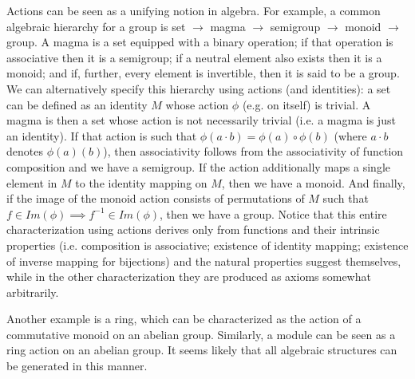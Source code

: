\documentclass[pra,twocolumn,groupedaddress,10pt]{revtex4}
\theoremstyle{definition}
\begin{document}
Actions can be seen as a unifying notion in algebra. For example, a common algebraic hierarchy for a group is \textsf{set} $\rightarrow$ \textsf{magma} $\rightarrow$ \textsf{semigroup} $\rightarrow$ \textsf{monoid} $\rightarrow$ \textsf{group}. A magma is a set equipped with a binary operation; if that operation is associative then it is a semigroup; if a neutral element also exists then it is a monoid; and if, further, every element is invertible, then it is said to be a group. We can alternatively specify this hierarchy using actions (and identities): a set can be defined as an identity $M$ whose action $\phi$ (e.g. on itself) is trivial. A magma is then a set whose action is not necessarily trivial (i.e. a magma is just an identity). If that action is such that $\phi(a \cdot b) = \phi(a) \circ \phi(b)$ (where $a \cdot b$ denotes $\phi(a)(b)$), then associativity follows from the associativity of function composition and we have a semigroup. If the action additionally maps a single element in $M$ to the identity mapping on $M$, then we have a monoid. And finally, if the image of the monoid action consists of permutations of $M$ such that $f \in Im(\phi) \implies f^{-1} \in Im(\phi)$, then we have a group. Notice that this entire characterization using actions derives only from functions and their intrinsic properties (i.e. composition is associative; existence of identity mapping; existence of inverse mapping for bijections) and the natural properties suggest themselves, while in the other characterization they are produced as axioms somewhat arbitrarily.

Another example is a ring, which can be characterized as the action of a commutative monoid on an abelian group. Similarly, a module can be seen as a ring action on an abelian group. It seems likely that all algebraic structures can be generated in this manner.
\end{document}
